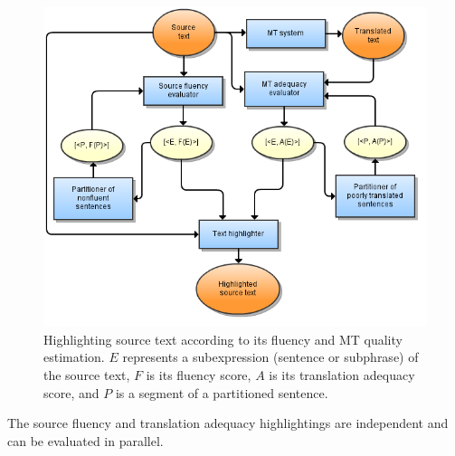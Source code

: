 \documentclass[hidelinks,10pt,letter]{article} %
\begin{document}
    \begin{figure}[h] %
      \centering
        \includegraphics[width=\textwidth]{mt.png}
        \caption{Highlighting source text according to its fluency and MT quality estimation. $E$ represents a subexpression (sentence or subphrase) of the source text,
      $F$ is its fluency score, $A$ is its translation adequacy score, and $P$ is a segment of a partitioned sentence.}\label{fig:alg}
    \end{figure}
    
    The source fluency and translation adequacy highlightings are independent and can be evaluated in parallel.
    
\end{document}
